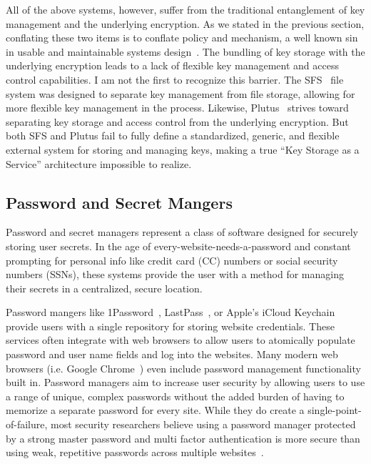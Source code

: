 All of the above systems, however, suffer from the traditional
entanglement of key management and the underlying encryption. As we
stated in the previous section, conflating these two items is to
conflate policy and mechanism, a well known sin in usable and
maintainable systems design~\cite{Wulf1974}. The bundling of key
storage with the underlying encryption leads to a lack of flexible key
management and access control capabilities. I am not the first to
recognize this barrier. The SFS~\cite{Mazieres1999} file system was
designed to separate key management from file storage, allowing for
more flexible key management in the process. Likewise,
Plutus~\cite{Kallahalla2003} strives toward separating key storage and
access control from the underlying encryption. But both SFS and Plutus
fail to fully define a standardized, generic, and flexible external
system for storing and managing keys, making a true ``Key Storage as a
Service'' architecture impossible to realize.

\subsection{Password and Secret Mangers}

Password and secret managers represent a class of software designed
for securely storing user secrets. In the age of
every-website-needs-a-password and constant prompting for personal
info like credit card (CC) numbers or social security numbers (SSNs),
these systems provide the user with a method for managing their
secrets in a centralized, secure location.

Password mangers like 1Password~\cite{onepassword},
LastPass~\cite{lastpass}, or Apple's iCloud Keychain~\cite{icloud}
provide users with a single repository for storing website
credentials. These services often integrate with web browsers to allow
users to atomically populate password and user name fields and log
into the websites. Many modern web browsers (i.e. Google
Chrome~\cite{google-chrome}) even include password management
functionality built in. Password managers aim to increase user
security by allowing users to use a range of unique, complex passwords
without the added burden of having to memorize a separate password for
every site. While they do create a single-point-of-failure, most
security researchers believe using a password manager protected by a
strong master password and multi factor authentication is more secure
than using weak, repetitive passwords across multiple
websites~\cite{schneier-passwords, krebs-passwords, brodkin-passman}.


